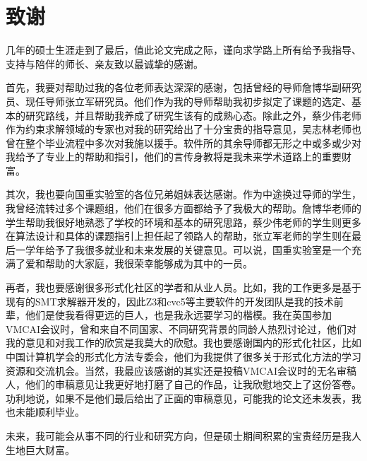 \chapter[致谢]{致\quad 谢}%

几年的硕士生涯走到了最后，值此论文完成之际，谨向求学路上所有给予我指导、支持与陪伴的师长、亲友致以最诚挚的感谢。

首先，我要对帮助过我的各位老师表达深深的感谢，包括曾经的导师詹博华副研究员、现任导师张立军研究员。他们作为我的导师帮助我初步拟定了课题的选定、基本的研究路线，并且帮助我养成了研究生该有的成熟心态。除此之外，蔡少伟老师作为约束求解领域的专家也对我的研究给出了十分宝贵的指导意见，吴志林老师也曾在整个毕业流程中多次对我施以援手。软件所的其余导师都无形之中或多或少对我给予了专业上的帮助和指引，他们的言传身教将是我未来学术道路上的重要财富。

其次，我也要向国重实验室的各位兄弟姐妹表达感谢。作为中途换过导师的学生，我曾经流转过多个课题组，他们在很多方面都给予了我极大的帮助。詹博华老师的学生帮助我很好地熟悉了学校的环境和基本的研究思路，蔡少伟老师的学生则更多在算法设计和具体的课题指引上担任起了领路人的帮助，张立军老师的学生则在最后一学年给予了我很多就业和未来发展的关键意见。可以说，国重实验室是一个充满了爱和帮助的大家庭，我很荣幸能够成为其中的一员。

再者，我也要感谢很多形式化社区的学者和从业人员。比如，我的工作更多是基于现有的SMT求解器开发的，因此Z3和cvc5等主要软件的开发团队是我的技术前辈，他们是使我看得更远的巨人，也是我永远要学习的楷模。我在英国参加VMCAI会议时，曾和来自不同国家、不同研究背景的同龄人热烈讨论过，他们对我的意见和对我工作的欣赏是我莫大的欣慰。我也要感谢国内的形式化社区，比如中国计算机学会的形式化方法专委会，他们为我提供了很多关于形式化方法的学习资源和交流机会。当然，我最应该感谢的其实还是投稿VMCAI会议时的无名审稿人，他们的审稿意见让我更好地打磨了自己的作品，让我欣慰地交上了这份答卷。功利地说，如果不是他们最后给出了正面的审稿意见，可能我的论文还未发表，我也未能顺利毕业。

未来，我可能会从事不同的行业和研究方向，但是硕士期间积累的宝贵经历是我人生地巨大财富。


